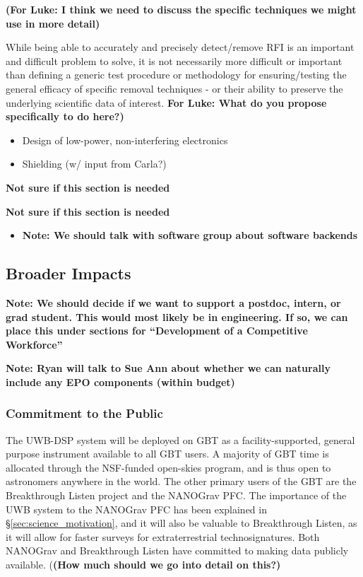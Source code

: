 \documentclass[10pt]{myNSF}
\begin{document}
\begin{itemize}
\textbf{(For Luke: I think we need to discuss the specific techniques
  we might use in more detail)}

 While being able to
accurately and precisely detect/remove RFI is an important and
difficult problem to solve, it is not necessarily more difficult or
important than defining a generic test procedure or methodology for
ensuring/testing the general efficacy of specific removal techniques -
or their ability to preserve the underlying scientific data of
interest. \textbf{For Luke: What do you propose specifically to do
  here?)}

\begin{itemize}
\item{Design of low-power, non-interfering electronics}
\item{Shielding (w/ input from Carla?)}
\end{itemize}

 \textbf{Not sure if this
  section is needed}

 \textbf{Not sure if this
  section is needed}
\begin{itemize}
\item{\textbf{Note: We should talk with software group about
      software backends}}
\end{itemize}

\subsection{Broader Impacts}
\label{sec:BI}

\textbf{Note: We should decide if we want to support a postdoc,
  intern, or grad student.  This would most likely be in engineering.
  If so, we can place this under sections for ``Development of a
  Competitive Workforce''}

\textbf{Note: Ryan will talk to Sue Ann about whether we can naturally
  include any EPO components (within budget)}

\subsubsection{Commitment to the Public}
\label{sec:commitment}

The UWB-DSP system will be deployed on GBT as a facility-supported,
general purpose instrument available to all GBT users.  A majority of
GBT time is allocated through the NSF-funded open-skies program, and
is thus open to astronomers anywhere in the world.  The other primary
users of the GBT are the Breakthrough Listen project and the NANOGrav
PFC.  The importance of the UWB system to the NANOGrav PFC has been
explained in \S\ref{sec:science_motivation}, and it will also be
valuable to Breakthrough Listen, as it will allow for faster surveys
for extraterrestrial technosignatures.  Both NANOGrav and Breakthrough
Listen have committed to making data publicly available. (\textbf{(How
  much should we go into detail on this?)}


\end{itemize}
\end{document}
